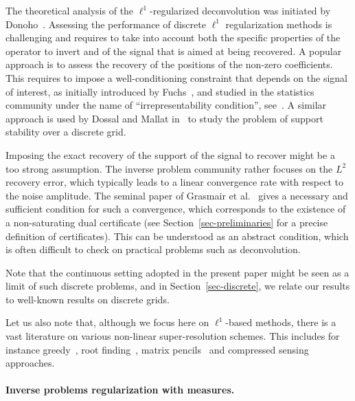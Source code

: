 The theoretical analysis of the $\ell^1$-regularized deconvolution was initiated by Donoho~\cite{Donoho-superresol-sparse}.  Assessing the performance of discrete $\ell^1$ regularization methods is challenging and requires to take into account both the specific properties of the operator to invert and of the signal that is aimed at being recovered. A popular approach is to assess the recovery of the positions of the non-zero coefficients. This requires to impose a well-conditioning constraint that depends on the signal of interest, as initially introduced by Fuchs~\cite{fuchs2004on-sp}, and studied in the statistics community under the name of ``irrepresentability condition'', see~\cite{Zhao-irrepresentability}. A similar approach is used by Dossal and Mallat in~\cite{DossalMallat} to study the problem of support stability over a discrete grid.

Imposing the exact recovery of the support of the signal to recover might be a too strong assumption. The inverse problem community rather focuses on the $L^2$ recovery error, which typically leads to a linear convergence rate with respect to the noise amplitude. The seminal paper of Grasmair et al.~\cite{Grasmair-cpam} gives a necessary and sufficient condition for such a convergence, which corresponds to the existence of a non-saturating dual certificate (see Section~\ref{sec-preliminaries} for a precise definition of certificates).  This can be understood as an abstract condition, which is often difficult to check on practical problems such as deconvolution. 

Note that the continuous setting adopted in the present paper might be seen as a limit of such discrete problems, and in Section~\ref{sec-discrete}, we relate our results to well-known results on discrete grids. 

Let us also note that, although we focus here on $\ell^1$-based methods, there is a vast literature on various non-linear super-resolution schemes. This includes for instance greedy~\cite{Odendaal-music,Lorenz-omp}, root finding~\cite{Blu-fri,Condat-Cadzow}, matrix pencils~\cite{Demanet-pencil} and compressed sensing~\cite{Fannjiang-cs-unresolved,Duarte-spectral-cs} approaches. 

\paragraph{Inverse problems regularization with measures.}

